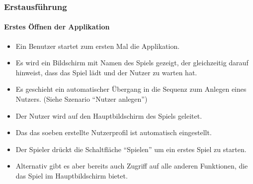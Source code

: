\subsubsection{Erstausführung}
\paragraph{Erstes Öffnen der Applikation}\mbox{}\newline
\begin{itemize}
\item Ein Benutzer startet zum ersten Mal die Applikation. 
\item Es wird ein Bildschirm mit Namen des Spiels gezeigt, der gleichzeitig darauf
hinweist, dass das Spiel lädt und der Nutzer zu warten hat.
\item Es geschieht ein automatischer Übergang in die Sequenz zum
Anlegen eines Nutzers. \newline (Siehe Szenario "`Nutzer anlegen"')
\item Der Nutzer wird auf den Hauptbildschirm des Spiels geleitet. 
\item Das das soeben erstellte Nutzerprofil ist automatisch eingestellt.
\item Der Spieler drückt die Schaltfläche "`Spielen"' um ein erstes Spiel zu starten.
\item Alternativ gibt es aber bereits auch Zugriff auf alle anderen Funktionen,
die das Spiel im Hauptbildschirm bietet.
\end{itemize}

